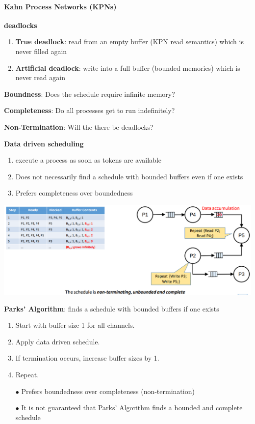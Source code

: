 \documentclass[english]{latex4ei/latex4ei_sheet}
\begin{document}
\paragraph{Kahn Process Networks (KPNs)}

\textbf{deadlocks}
\begin{enumerate}
  \item \textbf{True deadlock}: read from an empty buffer (KPN read semantics) which is never filled again
\item \textbf{Artificial deadlock}: write into a full buffer (bounded memories) which is never read again
\end{enumerate}

\textbf{Boundness}: Does the schedule require infinite memory?

\textbf{Completeness}: Do all processes get to run indefinitely?

\textbf{Non-Termination}: Will the there be deadlocks?

\textbf{Data driven scheduling}
\begin{enumerate}
	\item execute a process as soon as tokens are available
	\item Does not necessarily find a schedule with bounded buffers even if one exists
	\item Prefers completeness over boundedness
\end{enumerate}

\begin{center}
  \includegraphics[width=0.8\linewidth]{assets/KPNDataExample.png}
  \label{fig:kpndataexample}
\end{center}

\textbf{Parks' Algorithm}: finds a schedule with bounded buffers if one exists
\begin{enumerate}
	\item Start with buffer size 1 for all channels.
	\item Apply data driven schedule.
	\item If termination occurs, increase buffer sizes by 1.
	\item Repeat.
	\item[$\bullet$] Prefers boundedness over completeness (non-termination)
	\item[$\bullet$] It is not guaranteed that Parks’ Algorithm finds a bounded and complete schedule
\end{enumerate}
\end{document}
